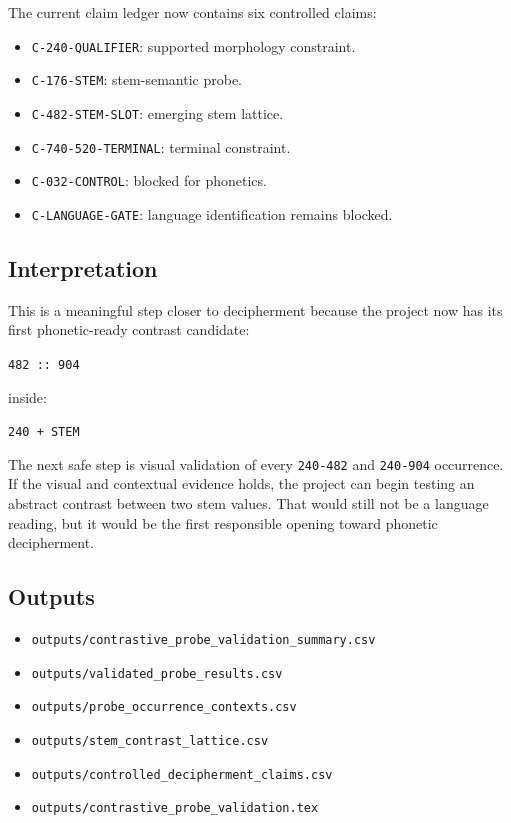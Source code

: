 The current claim ledger now contains six controlled claims:

\begin{itemize}
  \item \texttt{C-240-QUALIFIER}: supported morphology constraint.
  \item \texttt{C-176-STEM}: stem-semantic probe.
  \item \texttt{C-482-STEM-SLOT}: emerging stem lattice.
  \item \texttt{C-740-520-TERMINAL}: terminal constraint.
  \item \texttt{C-032-CONTROL}: blocked for phonetics.
  \item \texttt{C-LANGUAGE-GATE}: language identification remains blocked.
\end{itemize}

\subsection{Interpretation}

This is a meaningful step closer to decipherment because the project now has its first phonetic-ready contrast candidate:

\begin{center}
\texttt{482 :: 904}
\end{center}

inside:

\begin{center}
\texttt{240 + STEM}
\end{center}

The next safe step is visual validation of every \texttt{240-482} and \texttt{240-904} occurrence. If the visual and contextual evidence holds, the project can begin testing an abstract contrast between two stem values. That would still not be a language reading, but it would be the first responsible opening toward phonetic decipherment.

\subsection{Outputs}

\begin{itemize}
  \item \texttt{outputs/contrastive\_probe\_validation\_summary.csv}
  \item \texttt{outputs/validated\_probe\_results.csv}
  \item \texttt{outputs/probe\_occurrence\_contexts.csv}
  \item \texttt{outputs/stem\_contrast\_lattice.csv}
  \item \texttt{outputs/controlled\_decipherment\_claims.csv}
  \item \texttt{outputs/contrastive\_probe\_validation.tex}
\end{itemize}
